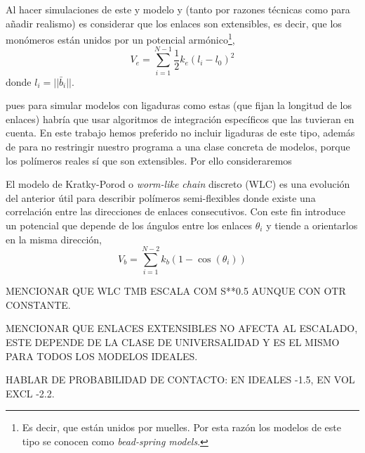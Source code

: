 Al hacer simulaciones de este y modelo y  (tanto por razones técnicas como para añadir realismo) es considerar que los enlaces son extensibles, es decir, que los monómeros están unidos por un potencial armónico\footnote{Es decir, que están unidos por muelles. Por esta razón los modelos de este tipo se conocen como \textit{bead-spring models}.},
\begin{equation}
    \label{eq:Harmonic}
    V_e=\sum_{i=1}^{N-1}\frac{1}{2}k_e(l_i-l_0)^2
\end{equation}
donde $l_i=||\bar{b}_i||$.

pues para simular modelos con ligaduras como estas (que fijan la longitud de los enlaces) habría que usar algoritmos de integración específicos que las tuvieran en cuenta. En este trabajo hemos preferido no incluir ligaduras de este tipo, además de para no restringir nuestro programa a una clase concreta de modelos, porque los polímeros reales sí que son extensibles. Por ello consideraremos

El modelo de Kratky-Porod o \textit{worm-like chain} discreto (WLC) es una evolución del anterior útil para describir polímeros semi-flexibles donde existe una correlación entre las direcciones de enlaces consecutivos. Con este fin introduce un potencial que depende de los ángulos entre los enlaces $\theta_i$ y tiende a orientarlos en la misma dirección,
\begin{equation}
    \label{eq:WLC_Potential}
    V_b=\sum_{i=1}^{N-2} k_b (1-\cos(\theta_i))
\end{equation}

MENCIONAR QUE WLC TMB ESCALA COM S**0.5 AUNQUE CON OTR CONSTANTE.

MENCIONAR QUE ENLACES EXTENSIBLES NO AFECTA AL ESCALADO, ESTE DEPENDE DE LA CLASE DE UNIVERSALIDAD Y ES EL MISMO PARA TODOS LOS MODELOS IDEALES.

HABLAR DE PROBABILIDAD DE CONTACTO: EN IDEALES -1.5, EN VOL EXCL -2.2.
